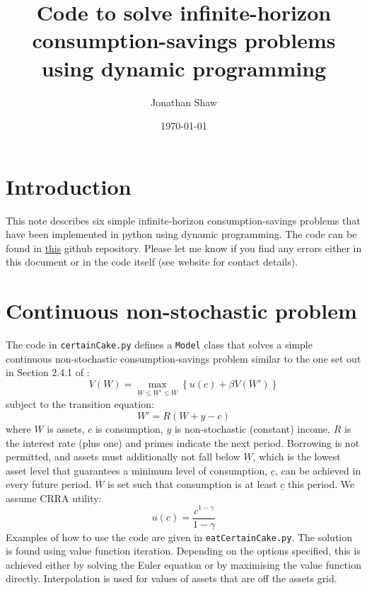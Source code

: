 \documentclass[12pt]{article}
\title{Code to solve infinite-horizon consumption-savings problems using dynamic programming}
\author{
        Jonathan Shaw
}
\date{\today}
\begin{document}
\maketitle

\section{Introduction}

This note describes six simple infinite-horizon consumption-savings problems that have been implemented in python using dynamic programming. The code can be found in \href{https://github.com/jms202/simpleInfDP.git}{this} github repository. Please let me know if you find any errors either in this document or in the code itself (see website for contact details).

\section{Continuous non-stochastic problem}

The code in \texttt{certainCake.py} defines a \texttt{Model} class that solves a simple continuous non-stochastic consumption-savings problem similar to the one set out in Section 2.4.1 of \citet{adda2003dynamic}:
\begin{equation}
	V(W) = \max_{\underline{W} \leq W' \leq \overline{W}} \left\{ u(c) + \beta V(W') \right\}
\end{equation}
subject to the transition equation:
\begin{equation}
	W' = R (W + y - c)
\end{equation}
where \(W\) is assets, \(c\) is consumption, \(y\) is non-stochastic (constant) income, \(R\) is the interest rate (plus one) and primes indicate the next period. Borrowing is not permitted, and assets must additionally not fall below \(\underline{W}\), which is the lowest asset level that guarantees a minimum level of consumption, \(\underline{c}\), can be achieved in every future period. \(\overline{W}\) is set such that consumption is at least \(\underline{c}\) this period. We assume CRRA utility:
\begin{equation}
	u(c) = \frac{c^{1 - \gamma}}{1 - \gamma}
\end{equation}
Examples of how to use the code are given in \texttt{eatCertainCake.py}. The solution is found using value function iteration. Depending on the options specified, this is achieved either by solving the Euler equation or by maximising the value function directly. Interpolation is used for values of assets that are off the assets grid.
\end{document}
